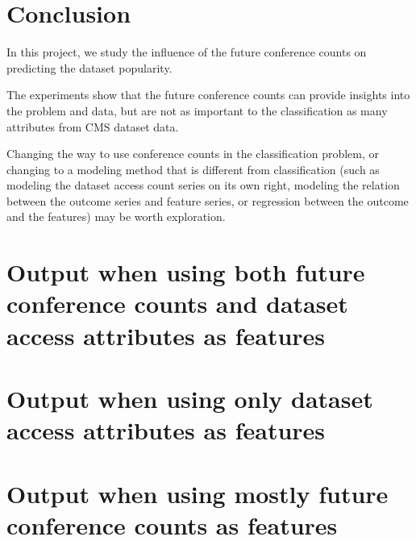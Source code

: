 \documentclass[preprint, 12pt]{elsarticle}
\begin{document}
\section{Conclusion}

In this project, we study the influence of the future conference counts on predicting the dataset popularity.

The experiments show that the future conference counts can provide insights into the problem and data,
but are not as important to the classification as many attributes from CMS dataset data.

Changing the way to use conference counts in the classification problem, or changing to a modeling method that is different from classification (such as modeling the dataset access count series on its own right, modeling the relation between the outcome series and feature series, or regression between the outcome and the features) may be worth exploration.



\appendix

\section{Output when using both future conference counts and dataset access attributes as features}
\label{app1}


\section{Output when using only dataset access attributes as features}
\label{app2}


\section{Output when using mostly future conference counts as features}
\label{app3}


  

\end{document}
